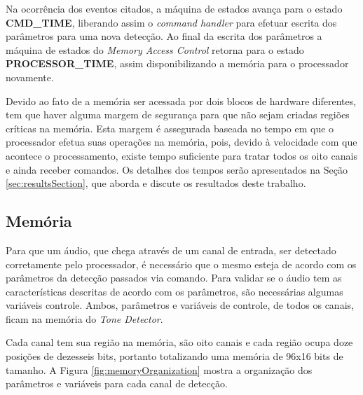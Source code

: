 \documentclass[monografia]{subfiles}
\begin{document}
		Na ocorrência dos eventos citados, a máquina de estados avança para o estado \textbf{CMD\_TIME}, liberando assim o \textit{command handler} para
		efetuar escrita dos parâmetros para uma nova detecção. Ao final da escrita dos parâmetros a máquina de estados do \textit{Memory Access Control}
		retorna para o estado \textbf{PROCESSOR\_TIME}, assim disponibilizando a memória para o processador novamente.

		Devido ao fato de a memória ser acessada por dois blocos de hardware diferentes, tem que haver alguma margem de segurança para que não sejam criadas
		regiões críticas na memória. Esta margem é assegurada baseada no tempo em que o processador efetua suas operações na memória, pois, devido à velocidade
		com que acontece o processamento, existe tempo suficiente para tratar todos os oito canais e ainda receber comandos. Os detalhes dos tempos serão 
		apresentados na Seção \ref{sec:resultsSection}, que aborda e discute os resultados deste trabalho.
	

	\newpage

	\subsection{Memória}
	\label{sec:memoryorganizationSection}	

		Para que um áudio, que chega através de um canal de entrada, ser detectado corretamente pelo processador, é necessário que o mesmo
		esteja de acordo com os parâmetros da detecção passados via comando. Para validar se o áudio tem as características descritas de acordo com os
		parâmetros, são necessárias algumas variáveis controle. Ambos, parâmetros e variáveis de controle, de todos os canais, ficam na memória do 
		\textit{Tone Detector}. 

		Cada canal tem sua região na memória, são oito canais e cada região ocupa doze posições de dezesseis bits, portanto totalizando uma 
		memória de 96x16 bits de tamanho. A Figura \ref{fig:memoryOrganization} mostra a organização dos parâmetros e variáveis para cada canal de
		detecção.
			
\end{document}
